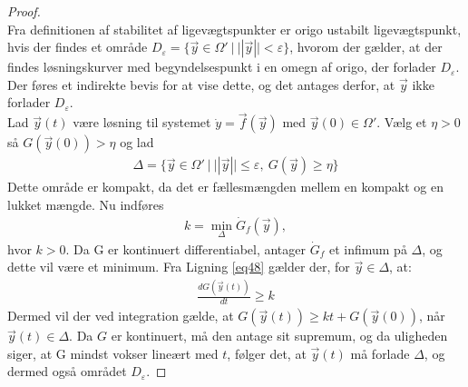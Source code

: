 \begin{proof}\\
Fra definitionen af stabilitet af ligevægtspunkter er origo ustabilt ligevægtspunkt, hvis der findes et område $D_{\varepsilon}=\{\vec{y}\in \Omega' \ | \ ||\vec{y}||<\varepsilon\}$, hvorom der gælder, at der findes løsningskurver med begyndelsespunkt i en omegn af origo, der forlader $D_{\varepsilon}$. Der føres et indirekte bevis for at vise dette, og det antages derfor, at $\vec{y}$ ikke forlader $D_{\varepsilon}$.\\
\hfill \break
Lad $\vec{y}(t)$ være løsning til systemet $\dot{y}=\vec{f}(\vec{y})$ med $\vec{y}(0)\in \Omega'$. Vælg et $\eta> 0$ så $G(\vec{y}(0))>\eta$ og lad
\begin{align*}
    \Delta = \{\vec{y}\in \Omega' \ | \ ||\vec{y}||\leq \varepsilon, \ G(\vec{y})\geq \eta\}
\end{align*}
Dette område er kompakt, da det er fællesmængden mellem en kompakt og en lukket mængde. Nu indføres
\begin{align*}
    k=\min_{\Delta}\dot{G}_f(\vec{y}),
\end{align*}
hvor $k>0$. Da G er kontinuert differentiabel, antager $\dot{G}_f$ et infimum på $\Delta$, og dette vil være et minimum. Fra Ligning \eqref{eq48} gælder der, for $\vec{y} \in \Delta$, at:
\begin{align*}
    \frac{dG(\vec{y}(t))}{dt}\geq k
\end{align*}
Dermed vil der ved integration gælde, at $G(\vec{y}(t))\geq kt+G(\vec{y}(0))$, når $\vec{y}(t)\in \Delta$. Da $G$ er kontinuert, må den antage sit supremum, og da uligheden siger, at G mindst vokser lineært med $t$, følger det, at $\vec{y}(t)$ må forlade $\Delta$, og dermed også området $D_{\varepsilon}$.
\end{proof}